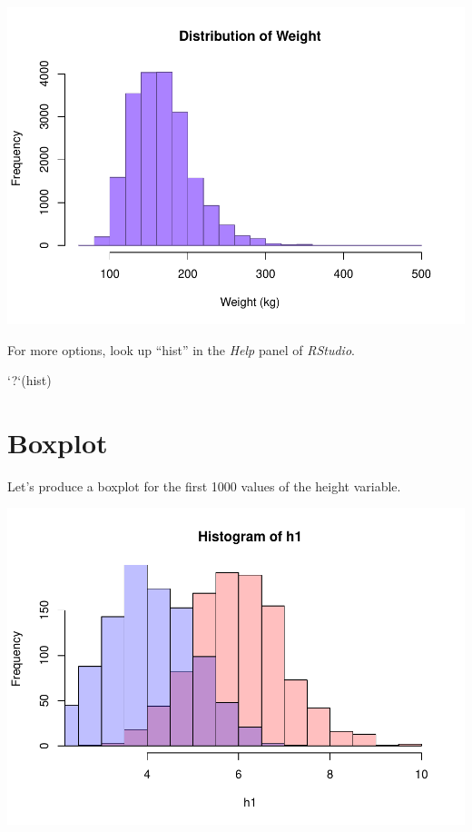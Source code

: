 \documentclass[
]{book}
\newenvironment{Shaded}{\begin{snugshade}}{\end{snugshade}}
\newcommand{\DataTypeTok}[1]{\textcolor[rgb]{0.13,0.29,0.53}{#1}}
\newcommand{\DecValTok}[1]{\textcolor[rgb]{0.00,0.00,0.81}{#1}}
\newcommand{\KeywordTok}[1]{\textcolor[rgb]{0.13,0.29,0.53}{\textbf{#1}}}
\newcommand{\NormalTok}[1]{#1}
\newcommand{\OperatorTok}[1]{\textcolor[rgb]{0.81,0.36,0.00}{\textbf{#1}}}
\newcommand{\StringTok}[1]{\textcolor[rgb]{0.31,0.60,0.02}{#1}}
\begin{document}
\includegraphics{_main_files/figure-latex/unnamed-chunk-173-1.pdf}

For more options, look up ``hist'' in the \emph{Help} panel of \emph{RStudio}.

\begin{Shaded}
\begin{Highlighting}[]
\StringTok{`}\DataTypeTok{?}\StringTok{`}\NormalTok{(hist)}
\end{Highlighting}
\end{Shaded}

\hypertarget{boxplot}{%
\section{Boxplot}\label{boxplot}}

Let's produce a boxplot for the first 1000 values of the height variable.

\begin{Shaded}
\end{Shaded}

\includegraphics{_main_files/figure-latex/unnamed-chunk-175-1.pdf}
\end{document}
